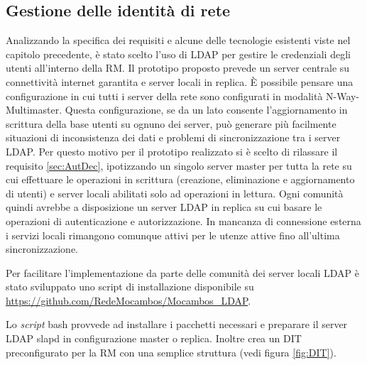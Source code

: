 \subsection{Gestione delle identità di rete}
Analizzando la specifica dei requisiti e alcune delle tecnologie
esistenti viste nel capitolo precedente, è stato scelto l'uso di LDAP
per gestire le credenziali degli utenti all'interno della RM. Il
prototipo proposto prevede un server centrale su connettività internet
garantita e server locali in replica. È possibile pensare una
configurazione in cui tutti i server della rete sono configurati in
modalità N-Way-Multimaster. Questa configurazione, se da un lato
consente l'aggiornamento in scrittura della base utenti su ognuno dei
server, può generare più facilmente situazioni di inconsistenza dei
dati e problemi di sincronizzazione tra i server LDAP. Per questo
motivo per il prototipo realizzato si è scelto di rilassare il
requisito \ref{sec:AutDec}, ipotizzando un singolo server master per
tutta la rete su cui effettuare le operazioni in scrittura (creazione,
eliminazione e aggiornamento di utenti) e server locali abilitati solo
ad operazioni in lettura. Ogni comunità quindi avrebbe a disposizione
un server LDAP in replica su cui basare le operazioni di
autenticazione e autorizzazione. In mancanza di connessione esterna i
servizi locali rimangono comunque attivi per le utenze attive fino
all'ultima sincronizzazione.

Per facilitare l'implementazione da parte delle comunità dei server
locali LDAP è stato sviluppato uno script di installazione disponibile
su \url{https://github.com/RedeMocambos/Mocambos_LDAP}.

Lo \textit{script} bash provvede ad installare i pacchetti necessari e
preparare il server LDAP slapd in configurazione master o
replica. Inoltre crea un DIT preconfigurato per la RM con una semplice
struttura (vedi figura \ref{fig:DIT}).




